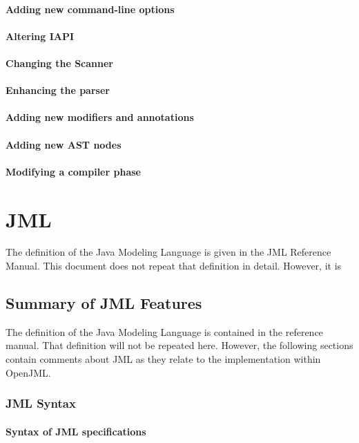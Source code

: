 \documentclass{report}%
\begin{document}
\subsection{Adding new command-line options}
\subsection{Altering IAPI}
\subsection{Changing the Scanner}
\subsection{Enhancing the parser}
\subsection{Adding new modifiers and annotations}
\subsection{Adding new AST nodes}
\subsection{Modifying a compiler phase}
\part{JML}

The definition of the Java Modeling Language is given in the JML Reference Manual\cite{TBD}.
This document does not repeat that definition in detail. However, it is 
\chapter{Summary of JML Features}

The definition of the Java Modeling Language is contained in the reference manual.\cite{TBD}
That definition will not be repeated here.  However, the following sections contain
comments about JML as they relate to the implementation within OpenJML.

\section{JML Syntax}

\subsection{Syntax of JML specifications}
\end{document}
